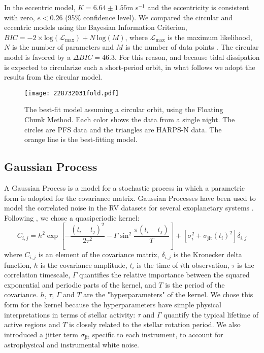 \documentclass[twocolumn]{aastex61}
\begin{document}
In the eccentric model, $K= 6.64 \pm 1.55$m s$^{-1}$ and the eccentricity is consistent with zero,
$e < 0.26$ (95\% confidence level). We compared the circular and eccentric models using the Bayesian Information Criterion, $BIC = -2\times \text{log}(\mathcal{L}_{\text{max}}) + N~\text{log}(M)$, where $\mathcal{L}_{\text{max}}$ is the maximum likelihood, $N$ is the number of parameters and $M$ is the number of data points \citep{Schwarz1978, Liddle2007}. The circular model is favored by a $\Delta BIC=46.3$. For this reason, and because tidal dissipation is expected to circularize such a short-period orbit,
in what follows we adopt the results from the circular model.

\begin{figure}
\begin{center}
\texttt{[image: 228732031fold.pdf]}
\caption{The best-fit model assuming a circular orbit, using the Floating Chunk Method. Each color
shows the data from a single night. The circles are PFS data and the triangles are HARPS-N data. The orange line is the best-fitting model.}
\label{fco}
\end{center}
\end{figure}


\subsection{Gaussian Process}
\label{sec:gp}

A Gaussian Process is a model for a stochastic process in which a parametric form is
adopted for the covariance matrix.  Gaussian Processes have been used to model the correlated noise in the RV datasets for several exoplanetary systems \citep[e.g. ][]{Haywood2014,Grunblatt2015,LM2016}. Following \citet{Haywood2014}, we chose a quasiperiodic kernel:
\begin{equation}
\label{covar}
C_{i,j} = h^2 \exp{\left[-\frac{(t_i-t_j)^2}{2\tau^2}-\Gamma \sin^2{\frac{\pi(t_i-t_j)}{T}}\right]}+\left[\sigma_i^2+\sigma_{\text{jit}}(t_i)^2\right]\delta_{i,j}
\end{equation}
where $C_{i,j}$ is an element of the covariance matrix, $\delta_{i,j}$ is the Kronecker delta function,
$h$ is the covariance amplitude, $t_i$ is the time of $i$th observation, $\tau$ is the correlation timescale, $\Gamma$ quantifies the relative importance between the squared exponential and periodic parts of the kernel, and $T$ is the period of the covariance. $h$, $\tau$, $\Gamma$ and $T$ are the "hyperparameters" of the kernel.
We chose this form for the kernel because the hyperparameters have simple physical interpretations
in terms of stellar activity: $\tau$ and $\Gamma$ quantify the typical lifetime of active regions and $T$ is closely related to the stellar rotation period.
We also introduced a jitter term $\sigma_{\text{jit}}$ specific to each instrument, to account for astrophysical and instrumental white noise.
\end{document}
